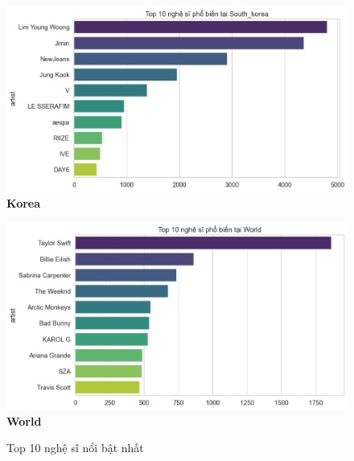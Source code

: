 \begin{itemize}
\begin{figure}[H]
        \begin{minipage}{0.45\textwidth}
            \centering
            \includegraphics[width=\linewidth]{../graphics/data_top50/figure/0/EDA_south_korea.png}
            \\[4pt] {\small \textbf{Korea}}
        \end{minipage}
        \hfill
        \begin{minipage}{0.45\textwidth}
            \centering
            \includegraphics[width=\linewidth]{../graphics/data_top50/figure/0/EDA_world.png}
            \\[4pt] {\small \textbf{World}}
        \end{minipage}



        
        \caption{Top 10 nghệ sĩ nổi bật nhất}
        \label{fig:energy-regions}
    \end{figure}
    

\end{itemize}
